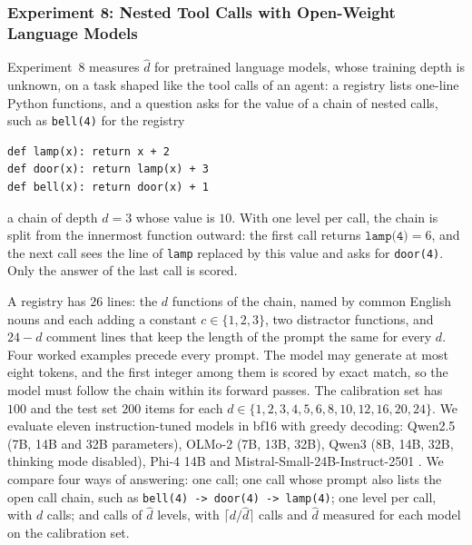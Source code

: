 \subsubsection{Experiment 8: Nested Tool Calls with Open-Weight Language Models}
\label{app:llm-handoff}

Experiment~8 measures $\hat d$ for pretrained language models, whose training depth is unknown, on a task shaped like the tool calls of an agent: a registry lists one-line Python functions, and a question asks for the value of a chain of nested calls, such as \texttt{bell(4)} for the registry
{\footnotesize
\begin{verbatim}
def lamp(x): return x + 2
def door(x): return lamp(x) + 3
def bell(x): return door(x) + 1
\end{verbatim}
}
\noindent a chain of depth $d=3$ whose value is $10$. With one level per call, the chain is split from the innermost function outward: the first call returns $\texttt{lamp(4)}=6$, and the next call sees the line of \texttt{lamp} replaced by this value and asks for \texttt{door(4)}. Only the answer of the last call is scored.

A registry has $26$ lines: the $d$ functions of the chain, named by common English nouns and each adding a constant $c\in\{1,2,3\}$, two distractor functions, and $24-d$ comment lines that keep the length of the prompt the same for every $d$. Four worked examples precede every prompt. The model may generate at most eight tokens, and the first integer among them is scored by exact match, so the model must follow the chain within its forward passes. The calibration set has $100$ and the test set $200$ items for each $d\in\{1,2,3,4,5,6,8,10,12,16,20,24\}$. We evaluate eleven instruction-tuned models in bf16 with greedy decoding: Qwen2.5 \citep{qwen2024qwen25} (7B, 14B and 32B parameters), OLMo-2 \citep{olmo2024olmo2} (7B, 13B, 32B), Qwen3 \citep{qwen2025qwen3} (8B, 14B, 32B, thinking mode disabled), Phi-4 14B \citep{abdin2024phi4} and Mistral-Small-24B-Instruct-2501 \citep{mistral2025small3}. We compare four ways of answering: one call; one call whose prompt also lists the open call chain, such as \texttt{bell(4) -> door(4) -> lamp(4)}; one level per call, with $d$ calls; and calls of $\hat d$ levels, with $\lceil d/\hat d\rceil$ calls and $\hat d$ measured for each model on the calibration set.

